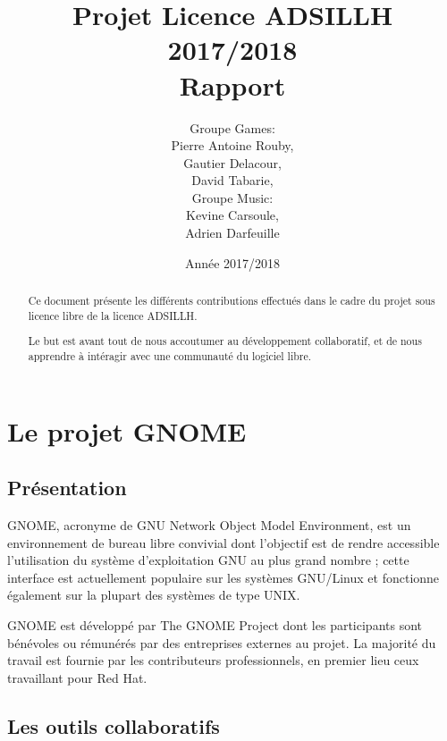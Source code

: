\documentclass[12pt]{report}
\title{Projet Licence ADSILLH 2017/2018\\Rapport}
\author{Groupe Games:\\ Pierre Antoine Rouby,\\ Gautier Delacour,\\
  \vspace{0.8cm}
  David Tabarie,\\ Groupe Music:\\ Kevine Carsoule,\\ Adrien Darfeuille}
\date{Année 2017/2018}
\begin{document}
\maketitle

\begin{abstract}
Ce document présente les différents contributions effectués dans le
cadre du projet sous licence libre de la licence ADSILLH.

Le but est avant tout de nous accoutumer au développement
collaboratif, et de nous apprendre à intéragir avec une communauté
du logiciel libre.
\end{abstract}

\tableofcontents

\chapter{Le projet GNOME}
\section{Présentation}
GNOME, acronyme de GNU Network Object Model Environment, est un
environnement de bureau libre convivial dont l'objectif est de rendre
accessible l'utilisation du système d'exploitation GNU au plus grand
nombre ; cette interface est actuellement populaire sur les systèmes
GNU/Linux et fonctionne également sur la plupart des systèmes de type
UNIX.

GNOME est développé par The GNOME Project dont les participants sont
bénévoles ou rémunérés par des entreprises externes au projet. La
majorité du travail est fournie par les contributeurs professionnels,
en premier lieu ceux travaillant pour Red Hat.

\section{Les outils collaboratifs} 
\end{document}
